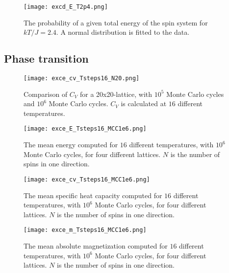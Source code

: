 \documentclass[12pt]{article}
\begin{document}
\begin{flushleft}
\begin{figure}[!h]
\begin{center}
\texttt{[image: excd\_E\_T2p4.png]}
\caption{\label{fig:E_prob_t2p4}The probability of a given total energy of the spin system for $kT/J=2.4$. A normal distribution is fitted to the data.}
\end{center}
\end{figure}















\subsection{Phase transition}

\begin{figure}[!h]
\begin{center}
\texttt{[image: exce\_cv\_Tsteps16\_N20.png]}
\caption{\label{fig:CV_1e5_and_1e6}Comparison of $C_V$ for a 20x20-lattice, with $10^5$ Monte Carlo cycles and $10^6$ Monte Carlo cycles. $C_V$ is calculated at $16$ different temperatures.}
\end{center}
\end{figure}

\begin{figure}[!h]
\begin{center}
\texttt{[image: exce\_E\_Tsteps16\_MCC1e6.png]}
\caption{\label{fig:E_1e6}The mean energy computed for $16$ different temperatures, with $10^6$ Monte Carlo cycles, for four different lattices. $N$ is the number of spins in one direction.}
\end{center}
\end{figure}

\begin{figure}[!h]
\begin{center}
\texttt{[image: exce\_cv\_Tsteps16\_MCC1e6.png]}
\caption{\label{fig:cv_1e6}The mean specific heat capacity computed for $16$ different temperatures, with $10^6$ Monte Carlo cycles, for four different lattices. $N$ is the number of spins in one direction.}
\end{center}
\end{figure}


\begin{figure}[!h]
\begin{center}
\texttt{[image: exce\_m\_Tsteps16\_MCC1e6.png]}
\caption{\label{fig:m_1e6}The mean absolute magnetization computed for $16$ different temperatures, with $10^6$ Monte Carlo cycles, for four different lattices. $N$ is the number of spins in one direction.}
\end{center}
\end{figure}


\end{flushleft}
\end{document}

